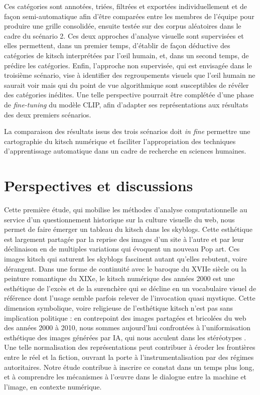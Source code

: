 \documentclass[final, fra]{anthology-ch}     %
\begin{document}
Ces catégories sont annotées, triées, filtrées et exportées individuellement et de façon semi-automatique afin d’être comparées entre les membres de l’équipe pour produire une grille consolidée, ensuite testée sur des corpus aléatoires dans le cadre du scénario 2. Ces deux approches d’analyse visuelle sont supervisées et elles permettent, dans un premier temps, d’établir de façon déductive des catégories de kitsch interprétées par l’œil humain, et, dans un second temps, de prédire les catégories. Enfin, l’approche non supervisée, qui est envisagée dans le troisième scénario, vise à identifier des regroupements visuels que l'œil humain ne saurait voir mais qui du point de vue algorithmique sont susceptibles de révéler des catégories inédites. Une telle perspective pourrait être complétée d'une phase de \textit{fine-tuning} du modèle CLIP, afin d'adapter ses représentations aux résultats des deux premiers scénarios. 


La comparaison des résultats issus des trois scénarios doit \textit{in fine} permettre une cartographie du kitsch numérique et faciliter l'appropriation des techniques d'apprentissage automatique dans un cadre de recherche en sciences humaines. 

\section{Perspectives et discussions}
Cette première étude, qui mobilise les méthodes d’analyse computationnelle au service d’un questionnement historique sur la culture visuelle du web, nous permet de faire émerger un tableau du kitsch dans les skyblogs. Cette esthétique est largement partagée par la reprise des images d’un site à l’autre et par leur déclinaison en de multiples variations qui évoquent un nouveau Pop art. Ces images kitsch qui saturent les skyblogs fascinent autant qu’elles rebutent, voire dérangent. Dans une forme de continuité avec le baroque du XVIIe siècle ou la peinture romantique du XIXe, le kitsch numérique des années 2000 est une esthétique de l’excès et de la surenchère qui se décline en un vocabulaire visuel de référence dont l’usage semble parfois relever de l’invocation quasi mystique\cite{carobolante_peinture_2026}. Cette dimension symbolique, voire religieuse de l’esthétique kitsch n’est pas sans implication politique : en contrepoint des images partagées et bricolées du web des années 2000 à 2010, nous sommes aujourd’hui confrontées à l’uniformisation esthétique des images générées par IA, qui nous acculent dans les stéréotypes \cite{guillaud_accules_2024, KONRADGlitchKitsch2025}. Une telle normalisation des représentations peut contribuer à éroder les frontières entre le réel et la fiction, ouvrant la porte à l’instrumentalisation par des régimes autoritaires. Notre étude contribue à inscrire ce constat dans un temps plus long, et à comprendre les mécanismes à l’œuvre dans le dialogue entre la machine et l'image, en contexte numérique.
\end{document}

